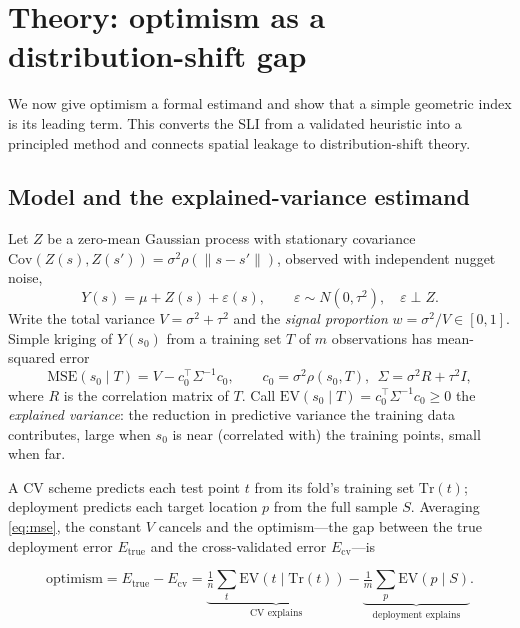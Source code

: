 \documentclass[11pt,a4paper]{article}
\newcommand{\EV}{\mathrm{EV}}
\begin{document}
\section{Theory: optimism as a distribution-shift gap}\label{sec:theory}

We now give optimism a formal estimand and show that a simple geometric index is
its leading term. This converts the SLI from a validated heuristic into a
principled method and connects spatial leakage to distribution-shift theory.

\subsection{Model and the explained-variance estimand}

Let $Z$ be a zero-mean Gaussian process with stationary covariance
$\mathrm{Cov}(Z(s),Z(s'))=\sigma^2\rho(\lVert s-s'\rVert)$, observed with
independent nugget noise,
\begin{equation}
Y(s)=\mu+Z(s)+\varepsilon(s),\qquad \varepsilon\sim N(0,\tau^2),\quad
\varepsilon \perp Z .
\end{equation}
Write the total variance $V=\sigma^2+\tau^2$ and the \emph{signal proportion}
$w=\sigma^2/V\in[0,1]$. Simple kriging of $Y(s_0)$ from a training set $T$ of $m$
observations has mean-squared error
\begin{equation}\label{eq:mse}
\mathrm{MSE}(s_0\mid T)=V - c_0^\top \Sigma^{-1} c_0 ,
\qquad c_0=\sigma^2\rho(s_0,T),\ \ \Sigma=\sigma^2 R + \tau^2 I,
\end{equation}
where $R$ is the correlation matrix of $T$. Call
$\EV(s_0\mid T)=c_0^\top\Sigma^{-1}c_0\ge 0$ the \emph{explained variance}: the
reduction in predictive variance the training data contributes, large when $s_0$ is
near (correlated with) the training points, small when far.

A CV scheme predicts each test point $t$ from its fold's training set $\mathrm{Tr}(t)$;
deployment predicts each target location $p$ from the full sample $S$. Averaging
\eqref{eq:mse}, the constant $V$ cancels and the optimism---the gap between the true
deployment error $E_{\text{true}}$ and the cross-validated error $E_{\text{cv}}$---is

\begin{equation}\label{eq:optimism}
\text{optimism}=E_{\text{true}}-E_{\text{cv}}
=\underbrace{\tfrac1n\textstyle\sum_t \EV(t\mid \mathrm{Tr}(t))}_{\text{CV explains}}
-\underbrace{\tfrac1m\textstyle\sum_p \EV(p\mid S)}_{\text{deployment explains}} .
\end{equation}
\end{document}
